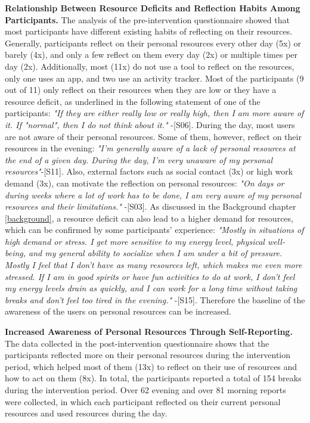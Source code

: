 \documentclass{hasel_thesis}
\begin{document}
\textbf{Relationship Between Resource Deficits and Reflection Habits Among Participants.}
The analysis of the pre-intervention questionnaire showed that most participants have different existing habits of reflecting on their resources. Generally, participants reflect on their personal resources every other day (5x) or barely (4x), and only a few reflect on them every day (2x) or multiple times per day (2x).  Additionally, most (11x) do not use a tool to reflect on the resources, only one uses an app, and two use an activity tracker.  Most of the participants (9 out of 11) only reflect on their resources when they are low or they have a resource deficit, as underlined in the following statement of one of the participants: \textit{"If they are either really low or really high, then I am more aware of it.  If "normal", then I do not think about it."} -[S06]. During the day, most users are not aware of their personal resources.  Some of them, however, reflect on their resources in the evening: \textit{"I'm generally aware of a lack of personal resources at the end of a given day.  During the day, I'm very unaware of my personal resources"}-[S11].  Also, external factors such as social contact (3x) or high work demand (3x), can motivate the reflection on personal resources: \textit{"On days or during weeks where a lot of work has to be done, I am very aware of my personal resources and their limitations." } -[S03]. As discussed in the Background chapter \ref{background}, a resource deficit can also lead to a higher demand for resources, which can be confirmed by some participants' experience: \textit{"Mostly in situations of high demand or stress.  I get more sensitive to my energy level, physical well-being, and my general ability to socialize when I am under a bit of pressure.  Mostly I feel that I don't have as many resources left, which makes me even more stressed.  If I am in good spirits or have fun activities to do at work, I don't feel my energy levels drain as quickly, and I can work for a long time without taking breaks and don't feel too tired in the evening." }-[S15]. Therefore the baseline of the awareness of the users on personal resources can be increased.

\textbf{Increased Awareness of Personal Resources Through Self-Reporting.} The data collected in the post-intervention questionnaire shows that the participants reflected more on their personal resources during the intervention period, which helped most of them (13x) to reflect on their use of resources and how to act on them (8x). In total, the participants reported a total of 154 breaks during the intervention period. Over 62 evening and over 81 morning reports were collected, in which each participant reflected on their current personal resources and used resources during the day.  
\end{document}
